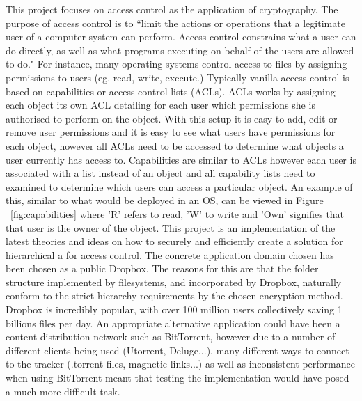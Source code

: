 \documentclass[10pt, titlepage]{article}
\begin{document}
\newline \indent This project focuses on access control as the application of cryptography. The purpose of access control is to ``limit the actions or operations that a legitimate user of a computer system can perform. Access control constrains what a user can do directly, as well as what programs executing on behalf of the users are allowed to do."\cite{accessControlPrinciples} For instance, many operating systems control access to files by assigning permissions to users (eg. read, write, execute.) Typically vanilla access control is based on capabilities or access control lists (ACLs). ACLs works by assigning each object its own ACL detailing for each user which permissions she is authorised to perform on the object. With this setup it is easy to add, edit or remove user permissions and it is easy to see what users have permissions for each object, however all ACLs need to be accessed to determine what objects a user currently has access to. Capabilities are similar to ACLs however each user is associated with a list instead of an object and all capability lists need to examined to determine which users can access a particular object. An example of this, similar to what would be deployed in an OS, can be viewed in Figure ~\ref{fig:capabilities} where 'R' refers to read, 'W' to write and 'Own' signifies that that user is the owner of the object.
\newline
\newline This project is an implementation of the latest theories and ideas on how to securely and efficiently create a solution for hierarchical a for access control. The concrete application domain chosen has been chosen as a public Dropbox. The reasons for this are that the folder structure implemented by filesystems, and incorporated by Dropbox, naturally conform to the strict hierarchy requirements by the chosen encryption method. Dropbox is incredibly popular, with over 100 million users collectively saving 1 billions files per day.\cite{dropboxInfo}
\newline \indent An appropriate alternative application could have been a content distribution network such as BitTorrent\cite{bittorrent}, however due to a number of different clients being used (Utorrent, Deluge...), many different ways to connect to the tracker (.torrent files, magnetic links...) as well as inconsistent performance when using BitTorrent meant that testing the implementation would have posed a much more difficult task.
\end{document}
